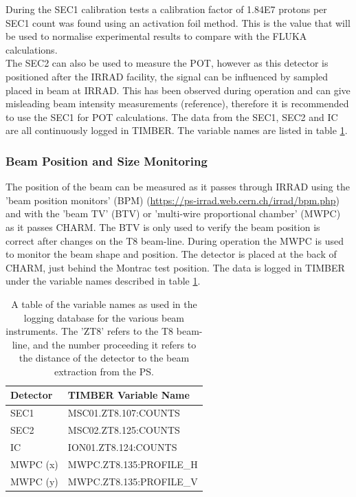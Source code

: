 During the SEC1 calibration tests \cite{pozzi2015} a calibration factor of 1.84E7 protons per SEC1 count was found using an activation foil method. This is the value that will be used to normalise experimental results to compare with the FLUKA calculations. \\

The SEC2 can also be used to measure the POT, however as this detector is positioned after the IRRAD facility, the signal can be influenced by sampled placed in beam at IRRAD. This has been observed during operation and can give misleading beam intensity measurements (reference), therefore it is recommended to use the SEC1 for POT calculations. The data from the SEC1, SEC2 and IC are all continuously logged in TIMBER. The variable names are listed in table \ref{tab:beam_instruments}. \\

\subsubsection{Beam Position and Size Monitoring}

The position of the beam can be measured as it passes through IRRAD using the 'beam position monitors' (BPM) (\url{https://ps-irrad.web.cern.ch/irrad/bpm.php}) and with the 'beam TV' (BTV) or 'multi-wire proportional chamber' (MWPC) as it passes CHARM. The BTV is only used to verify the beam position is correct after changes on the T8 beam-line. During operation the MWPC is used to monitor the beam shape and position. The detector is placed at the back of CHARM, just behind the Montrac test position. The data is logged in TIMBER under the variable names described in table \ref{tab:beam_instruments}. \\


\begin{table}[h!]
	\begin{center}
	\begin{tabular}{l|l}
	Detector & TIMBER Variable Name \\ 
	\hline 
	\hline
	SEC1 &  MSC01.ZT8.107:COUNTS \\ 
	SEC2 & MSC02.ZT8.125:COUNTS  \\ 
	IC & ION01.ZT8.124:COUNTS \\ 
	MWPC (x) & MWPC.ZT8.135:PROFILE\_H \\ 
	MWPC (y) & MWPC.ZT8.135:PROFILE\_V \\ 
	\end{tabular}
	\end{center}
	\caption{A table of the variable names as used in the logging database for the various beam instruments. The 'ZT8' refers to the T8 beam-line, and the number proceeding it refers to the distance of the detector to the beam extraction from the PS.}
	\label{tab:beam_instruments}
\end{table}

